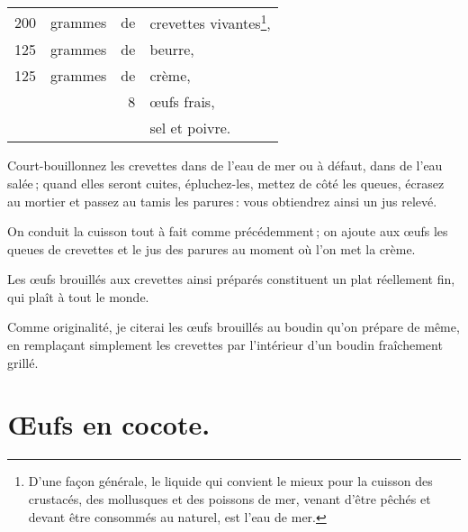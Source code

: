 \medskip

\footnotesize
\begin{longtable}{rrrp{16em}}
  200  & grammes & de & crevettes vivantes\footnote{D'une façon générale, le liquide
                                               qui convient le mieux pour la cuisson
                                               des crustacés, des mollusques et des
                                               poissons de mer, venant d'être pêchés
                                               et devant être consommés au naturel,
                                               est l'eau de mer.},                                        \\
  125  & grammes & de & beurre,                                                                           \\
  125  & grammes & de & crème,                                                                            \\
       &         &  8 & œufs frais,                                                                       \\
       &         &    & sel et poivre.                                                                    \\
\end{longtable}
\normalsize

Court-bouillonnez les crevettes dans de l'eau de mer ou à défaut, dans de l'eau
salée ; quand elles seront cuites, épluchez-les, mettez de côté les queues,
écrasez au mortier et passez au tamis les parures : vous obtiendrez ainsi un
jus relevé.

On conduit la cuisson tout à fait comme précédemment ; on ajoute aux œufs
les queues de crevettes et le jus des parures au moment où l'on met la crème.

Les œufs brouillés aux crevettes ainsi préparés constituent un plat réellement
fin, qui plaît à tout le monde.

\sk

Comme originalité, je citerai les œufs brouillés au boudin qu'on prépare de
même, en remplaçant simplement les crevettes par l'intérieur d'un boudin
fraîchement grillé.

\section*{\centering Œufs en cocote.}

